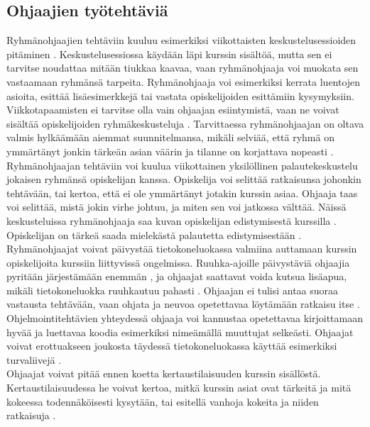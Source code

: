 \documentclass[finnish]{tktltiki2}
\theoremstyle{definition}
\theoremstyle{remark}
\begin{document}
\subsection{Ohjaajien työtehtäviä}
Ryhmänohjaajien tehtäviin kuuluu esimerkiksi viikottaisten keskustelusessioiden pitäminen \cite{Reges88}. Keskustelusessiossa käydään läpi kurssin sisältöä, mutta sen ei tarvitse noudattaa mitään tiukkaa kaavaa, vaan ryhmänohjaaja voi muokata sen vastaamaan ryhmänsä tarpeita. Ryhmänohjaaja voi esimerkiksi kerrata luentojen asioita, esittää lisäesimerkkejä tai vastata opiskelijoiden esittämiin kysymyksiin. Viikkotapaamisten ei tarvitse olla vain ohjaajan esiintymistä, vaan ne voivat sisältää opiskelijoiden ryhmäkeskusteluja \cite{Decker06}. Tarvittaessa ryhmänohjaajan on oltava valmis hylkäämään aiemmat suunnitelmansa, mikäli selviää, että ryhmä on ymmärtänyt jonkin tärkeän asian väärin ja tilanne on korjattava nopeasti \cite{Reges88}.
\\
Ryhmänohjaajan tehtäviin voi kuulua viikottainen yksilöllinen palautekeskustelu jokaisen ryhmänsä opiskelijan kanssa. Opiskelija voi selittää ratkaisunsa johonkin tehtävään, tai kertoa, että ei ole ymmärtänyt jotakin kurssin asiaa. Ohjaaja taas voi selittää, mistä jokin virhe johtuu, ja miten sen voi jatkossa välttää. Näissä keskusteluissa ryhmänohjaaja saa kuvan opiskelijan edistymisestä kurssilla \cite{Reges88,Reges03}. Opiskelijan on tärkeä saada mielekästä palautetta edistymisestään \cite{Kurhila11}.
\\
Ryhmänohjaajat voivat päivystää tietokoneluokassa valmiina auttamaan kurssin opiskelijoita kurssiin liittyvissä ongelmissa. Ruuhka-ajoille päivystäviä ohjaajia pyritään järjestämään enemmän \cite{Reges88, Reges03}, ja ohjaajat saattavat voida kutsua lisäapua, mikäli tietokoneluokka ruuhkautuu pahasti \cite{Kurhila11}. Ohjaajan ei tulisi antaa suoraa vastausta tehtävään, vaan ohjata ja neuvoa opetettavaa löytämään ratkaisu itse \cite{Vikberg, Kurhila11}. Ohjelmointitehtävien yhteydessä ohjaaja voi kannustaa opetettavaa kirjoittamaan hyvää ja luettavaa koodia esimerkiksi nimeämällä muuttujat selkeästi. Ohjaajat voivat erottuakseen joukosta täydessä tietokoneluokassa käyttää esimerkiksi turvaliivejä \cite{Vihavainen}. 
\\
Ohjaajat voivat pitää ennen koetta kertaustilaisuuden kurssin sisällöstä. Kertaustilaisuudessa he voivat kertoa, mitkä kurssin asiat ovat tärkeitä ja mitä kokeessa todennäköisesti kysytään, tai esitellä vanhoja kokeita ja niiden ratkaisuja \cite{Decker06}.
\\
\end{document}
